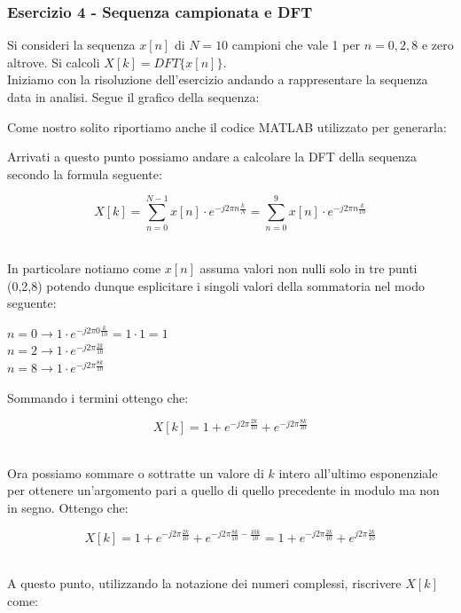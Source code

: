 \documentclass[../main.tex]{subfiles}
\begin{document}
\subsubsection{Esercizio 4 - Sequenza campionata e DFT}

Si consideri la sequenza $x[n]$ di $N = 10$ campioni che vale 1 per $n = 0,2,8$
e zero altrove. Si calcoli $X[k] = \unit{DFT}\{x[n]\}$.\\

Iniziamo con la risoluzione dell'esercizio andando a rappresentare la sequenza data in analisi.
Segue il grafico della sequenza:


Come nostro solito riportiamo anche il codice MATLAB utilizzato per generarla:


Arrivati a questo punto possiamo andare a calcolare la DFT della sequenza secondo la formula seguente:

\[X[k] = \sum_{n = 0}^{N-1} x[n] \cdot e^{-j2\pi n \frac{k}{N}}  = \sum_{n = 0}^{9} x[n] \cdot e^{-j2\pi n \frac{k}{10}}  \]\

In particolare notiamo come $x[n]$ assuma valori non nulli solo in tre punti (0,2,8) potendo dunque esplicitare i singoli valori della sommatoria nel modo seguente:

\begin{center}
	$ n = 0 \rightarrow 1 \cdot e^{-j2\pi 0 \frac{k}{10}} = 1 \cdot 1 = 1$\\
	$ n = 2 \rightarrow 1 \cdot e^{-j2\pi \frac{2k}{10}}  $\\
	$ n = 8 \rightarrow 1 \cdot e^{-j2\pi  \frac{8k}{10}} $\\
\end{center}

Sommando i termini ottengo che:

\[X[k] = 1 + e^{-j2\pi \frac{2k}{10}}  + e^{-j2\pi  \frac{8k}{10}} \]\

Ora possiamo sommare o sottratte un valore di $k$ intero all'ultimo esponenziale per ottenere un'argomento pari a quello di quello precedente in modulo ma non in segno. %
Ottengo che:

\[X[k] = 1 + e^{-j2\pi \frac{2k}{10}}  + e^{-j2\pi  \frac{8k}{10} - \frac{10k}{10}} = 1 + e^{-j2\pi \frac{2k}{10}}  + e^{j2\pi  \frac{2k}{10}} \]\

A questo punto, utilizzando la notazione dei numeri complessi, riscrivere $X[k]$ come:
\end{document}
